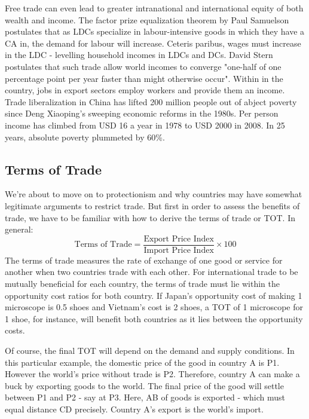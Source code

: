 Free trade can even lead to greater intranational and international equity of both wealth and income. The factor prize equalization theorem by Paul Samuelson postulates that as LDCs specialize in labour-intensive goods in which they have a CA in, the demand for labour will increase. Ceteris paribus, wages must increase in the LDC - levelling household incomes in LDCs and DCs. David Stern postulates that such trade allow world incomes to converge "one-half of one percentage point per year faster than might otherwise occur". Within in the country, jobs in export sectors employ workers and provide them an income. Trade liberalization in China has lifted 200 million people out of abject poverty since Deng Xiaoping's sweeping economic reforms in the 1980s. Per person income has climbed from USD 16 a year in 1978 to USD 2000 in 2008. In 25 years, absolute poverty plummeted by 60\%.
\subsection{Terms of Trade}
We're about to move on to protectionism and why countries may have somewhat legitimate arguments to restrict trade. But first in order to assess the benefits of trade, we have to be familiar with how to derive the terms of trade or TOT. In general:
$$\textrm{Terms of Trade}=\frac{\textrm{Export Price Index}}{\textrm{Import Price Index}}×100$$
The terms of trade measures the rate of exchange of one good or service for another when two countries trade with each other. For international trade to be mutually beneficial for each country, the terms of trade must lie within the opportunity cost ratios for both country. If Japan's opportunity cost of making 1 microscope is 0.5 shoes and Vietnam's cost is 2 shoes, a TOT of 1 microscope for 1 shoe, for instance, will benefit both countries as it lies between the opportunity costs.

Of course, the final TOT will depend on the demand and supply conditions. In this particular example, the domestic price of the good in country A is P1. However the world's price without trade is P2. Therefore, country A can make a buck by exporting goods to the world. The final price of the good will settle between P1 and P2 - say at P3. Here, AB of goods is exported - which must equal distance CD precisely. Country A's export is the world's import.

